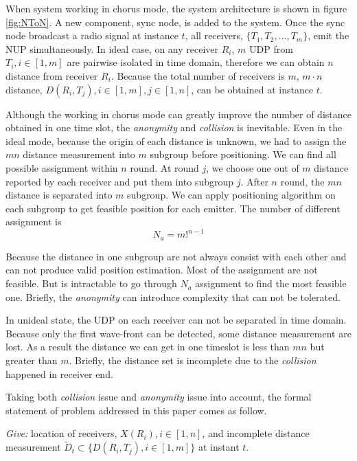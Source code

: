 \documentclass[conference]{IEEEtran}
\begin{document}
When system working in chorus mode, the system architecture is shown in figure
\ref{fig:NToN}. A new component, sync node, is added to the system. Once the sync node
broadcast a radio signal at instance $t$, all receivers, $\{T_1,T_2,\dots,T_m\}$, emit
the NUP simultaneously. In ideal case, on any receiver $R_i$, $m$ UDP from
$T_i,i\in[1,m]$ are pairwise isolated in time domain, therefore we can obtain $n$
distance from receiver $R_i$. Because the total number of receivers is $m$, $m\cdot n$
distance, $D(R_i,T_j),i\in[1,m],j\in[1,n]$, can be obtained at instance $t$. 

Although the working in chorus mode can greatly improve the number of distance obtained
in one time slot, the \emph{anonymity} and \emph{collision} is inevitable. Even in the
ideal mode, because the origin of each distance is unknown, we had to assign the $mn$
distance measurement into $m$ subgroup before positioning. We can find all possible
assignment within $n$ round. At round $j$, we choose one out of $m$ distance reported
by each receiver and put them into subgroup $j$. After $n$ round, the $mn$ distance is
separated into $m$ subgroup. We can apply positioning algorithm on each subgroup to get
feasible position for each emitter. The number of different assignment is 
\begin{equation}
    N_a=m!^{n-1}
    \label{equ:assign}
\end{equation}

Because the distance in one subgroup are not always consist with each other and can not
produce valid position estimation. Most of the assignment are not feasible. But is
intractable to go through $N_a$ assignment to find the most feasible one. Briefly, the
\emph{anonymity} can introduce complexity that can not be tolerated.

In unideal state, the UDP on each receiver can not be separated in time domain. Because
only the first wave-front can be detected, some distance measurement are lost. As a
result the distance we can get in one timeslot is less than $mn$ but greater than $m$.
Briefly, the distance set is incomplete due to the \emph{collision} happened in receiver
end.

Taking both \emph{collision} issue and \emph{anonymity} issue into account, the formal
statement of problem addressed in this paper comes as follow. 

\emph{Give:} location of receivers, $X(R_i),i\in[1,n]$, and incomplete distance measurement
$\tilde{D}_t\subset\{D(R_i,T_j),i\in[1,m]\}$ at instant $t$. 
\end{document}
